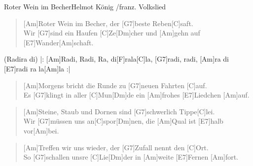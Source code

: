 \begin{song}{Roter Wein im Becher}{Helmot König /franz. Volkslied}

    \begin{verse}  
        [Am]Roter Wein im Becher, der [G7]beste Reben[C]saft. \\
        Wir [G7]sind ein Haufen [C]Ze[Dm]cher und [Am]gehn auf [E7]Wander[Am]schaft.
    \end{verse}  

    \begin{chorus}
        (Radira di) |: [Am]Radi, Radi, Ra, di[F]rala[C]la, [G7]radi, radi, [Am]ra di [E7]radi ra la[Am]la \hspace{0.5em}:|
    \end{chorus}

    \begin{verse}  
        [Am]Morgens bricht die Runde zu [G7]neuen Fahrten [C]auf. \\
        Es [G7]klingt in aller [C]Mun[Dm]de ein [Am]frohes [E7]Liedchen [Am]auf.
    \end{verse}  


    \begin{verse}  
        [Am]Steine, Staub und Dornen sind [G7]schwerlich Tippe[C]lei. \\
        Wir [G7]müssen uns an[C]spor[Dm]nen, die [Am]Qual ist [E7]halb vor[Am]bei.
    \end{verse}  


    \begin{verse}  
        [Am]Treffen wir uns wieder, der [G7]Zufall nennt den [C]Ort. \\
        So [G7]schallen unsre [C]Lie[Dm]der in [Am]weite [E7]Fernen [Am]fort.
    \end{verse}  


\end{song}
